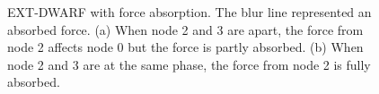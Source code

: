 \begin{figure}[!t]
\centerline{
	\hfil
}
\caption{EXT-DWARF with force absorption. The blur line represented an absorbed force. (a) When node 2 and 3 are apart, the force from node 2 affects node 0 but the force is partly absorbed. (b) When node 2 and 3 are at the same phase, the force from node 2 is fully absorbed.}
\label{fig:4nodes-chain-dwarf-absorb}
\lofcont
\end{figure}

